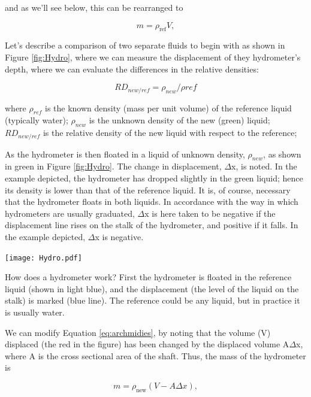 \documentclass{tufte-handout}
\begin{document}
and as we'll see below, this can be rearranged to 

\begin{equation}\label{eq:archmidies}
m = \rho_\mathrm{ref} V,
\end{equation}

Let's describe a comparison of two separate fluids to begin with as shown in Figure \ref{fig:Hydro}, where we can measure the displacement of they hydrometer's depth, where we can evaluate the differences in the relative densities: 

\begin{equation}
RD_{new/ref} = \rho_{new}/\rho{ref}
\end{equation}

\noindent where $\rho_{ref}$ is the known density (mass per unit volume) of the reference liquid (typically water);
$\rho_{new}$ is the unknown density of the new (green) liquid;
$RD_{new/ref}$ is the relative density of the new liquid with respect to the reference;

As the hydrometer is then floated in a liquid of unknown density, $\rho_{new}$, as shown in green in Figure \ref{fig:Hydro}. The change in displacement, $\Delta$x, is noted. In the example depicted, the hydrometer has dropped slightly in the green liquid; hence its density is lower than that of the reference liquid. It is, of course, necessary that the hydrometer floats in both liquids. In accordance with the way in which hydrometers are usually graduated, $\Delta$x is here taken to be negative if the displacement line rises on the stalk of the hydrometer, and positive if it falls. In the example depicted, $\Delta$x is negative.

\begin{marginfigure}
		\texttt{[image: Hydro.pdf]}
	\caption{How does a hydrometer work? First the hydrometer is floated in the reference liquid (shown in light blue), and the displacement (the level of the liquid on the stalk) is marked (blue line). The reference could be any liquid, but in practice it is usually water. }
	\label{fig:Hydro}
\end{marginfigure}

We can modify Equation \ref{eq:archmidies}, by noting that the volume (V) displaced (the red in the figure) has been changed by the displaced volume A$\Delta$x, where A is the cross sectional area of the shaft. Thus, the mass of the hydrometer is 

\begin{equation}\label{eq:hydrometer}
m = \rho_\mathrm{new} (V - A \Delta x),
\end{equation}
\end{document}
